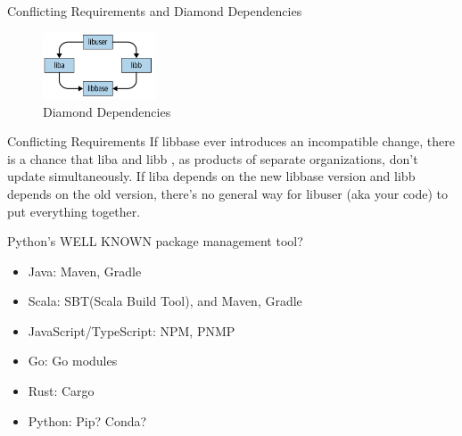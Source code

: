 \documentclass{ctexbeamer}
\begin{document}
\begin{frame}{Conflicting Requirements and Diamond Dependencies}
    \begin{figure}
        \includegraphics[width=0.3\textwidth, height=0.3\textheight]{./figures/diamond.png}
        \caption{Diamond Dependencies}
    \end{figure}

    \begin{alertblock}{Conflicting Requirements}
        If libbase ever introduces an incompatible change, 
        there is a chance that liba and libb , 
        as products of separate organizations, don't update simultaneously. 
        If liba depends on the new libbase version and libb depends 
        on the old version, there's no general way for libuser (aka your code) 
        to put everything together.
    \end{alertblock}

\end{frame}

\begin{frame}{Python's WELL KNOWN package management tool?}

    \begin{itemize}
        \item Java: Maven, Gradle
        \item Scala: SBT(Scala Build Tool), and Maven, Gradle
        \item JavaScript/TypeScript: NPM, PNMP
        \item Go: Go modules
        \item Rust: Cargo
        \item Python: Pip? Conda?
    \end{itemize}
\end{frame}
\end{document}
